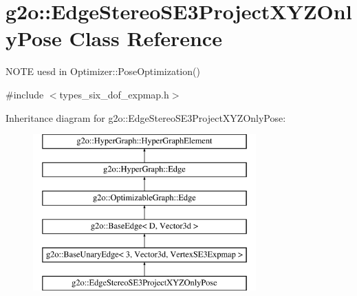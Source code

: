 \hypertarget{classg2o_1_1_edge_stereo_s_e3_project_x_y_z_only_pose}{}\section{g2o\+:\+:Edge\+Stereo\+S\+E3\+Project\+X\+Y\+Z\+Only\+Pose Class Reference}
\label{classg2o_1_1_edge_stereo_s_e3_project_x_y_z_only_pose}


N\+O\+TE uesd in Optimizer\+::\+Pose\+Optimization()  




{\ttfamily \#include $<$types\+\_\+six\+\_\+dof\+\_\+expmap.\+h$>$}

Inheritance diagram for g2o\+:\+:Edge\+Stereo\+S\+E3\+Project\+X\+Y\+Z\+Only\+Pose\+:\begin{figure}[H]
\begin{center}
\leavevmode
\includegraphics[height=6.000000cm]{classg2o_1_1_edge_stereo_s_e3_project_x_y_z_only_pose}
\end{center}
\end{figure}
